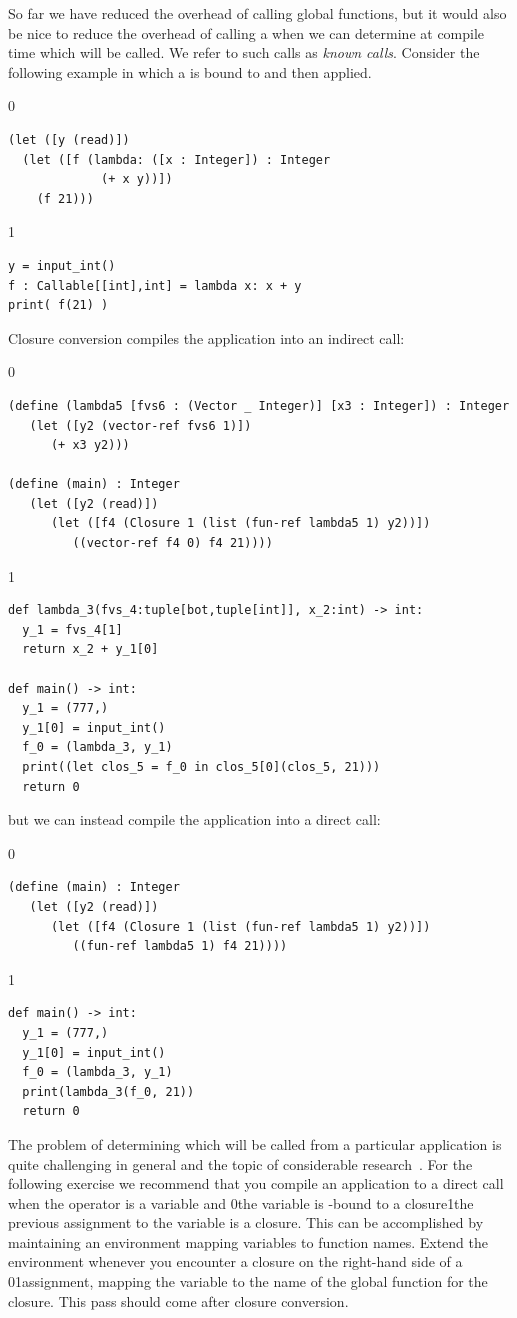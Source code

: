 \documentclass[7x10]{TimesAPriori_MIT}%
\def\racketEd{0}
\def\pythonEd{1}
\def\edition{0}
\newcommand{\racket}[1]{{\if\edition\racketEd{#1}\fi}}
\newcommand{\python}[1]{{\if\edition\pythonEd #1\fi}}
\numberwithin{theorem}{chapter}
\numberwithin{definition}{chapter}
\numberwithin{equation}{chapter}
\begin{document}
So far we have reduced the overhead of calling global functions, but
it would also be nice to reduce the overhead of calling a
 when we can determine at compile time which
 will be called. We refer to such calls as \emph{known
  calls}.  Consider the following example in which a  is
bound to  and then applied.
{\if\edition\racketEd
\begin{lstlisting}
(let ([y (read)])
  (let ([f (lambda: ([x : Integer]) : Integer
             (+ x y))])
    (f 21)))
\end{lstlisting}
\fi}
{\if\edition\pythonEd
\begin{lstlisting}
y = input_int()
f : Callable[[int],int] = lambda x: x + y
print( f(21) )
\end{lstlisting}
\fi}
%
\noindent Closure conversion compiles the application
 into an indirect call:
%
{\if\edition\racketEd
\begin{lstlisting}
(define (lambda5 [fvs6 : (Vector _ Integer)] [x3 : Integer]) : Integer
   (let ([y2 (vector-ref fvs6 1)])
      (+ x3 y2)))

(define (main) : Integer
   (let ([y2 (read)])
      (let ([f4 (Closure 1 (list (fun-ref lambda5 1) y2))])
         ((vector-ref f4 0) f4 21))))
\end{lstlisting}
\fi}
{\if\edition\pythonEd
\begin{lstlisting}
def lambda_3(fvs_4:tuple[bot,tuple[int]], x_2:int) -> int:
  y_1 = fvs_4[1]
  return x_2 + y_1[0]

def main() -> int:
  y_1 = (777,)
  y_1[0] = input_int()
  f_0 = (lambda_3, y_1)
  print((let clos_5 = f_0 in clos_5[0](clos_5, 21)))
  return 0
\end{lstlisting}
\fi}
%
\noindent but we can instead compile the application
 into a direct call:
%
{\if\edition\racketEd
\begin{lstlisting}
(define (main) : Integer
   (let ([y2 (read)])
      (let ([f4 (Closure 1 (list (fun-ref lambda5 1) y2))])
         ((fun-ref lambda5 1) f4 21))))
\end{lstlisting}
\fi}
{\if\edition\pythonEd
\begin{lstlisting}
def main() -> int:
  y_1 = (777,)
  y_1[0] = input_int()
  f_0 = (lambda_3, y_1)
  print(lambda_3(f_0, 21))
  return 0
\end{lstlisting}
\fi}

The problem of determining which  will be called from a
particular application is quite challenging in general and the topic
of considerable research~\citep{Shivers:1988aa,Gilray:2016aa}. For the
following exercise we recommend that you compile an application to a
direct call when the operator is a variable and \racket{the variable
  is -bound to a closure}\python{the previous assignment to
  the variable is a closure}.  This can be accomplished by maintaining
an environment mapping variables to function names.  Extend the
environment whenever you encounter a closure on the right-hand side of
a \racket{}\python{assignment}, mapping the variable to the
name of the global function for the closure. This pass should come
after closure conversion.
\end{document}
